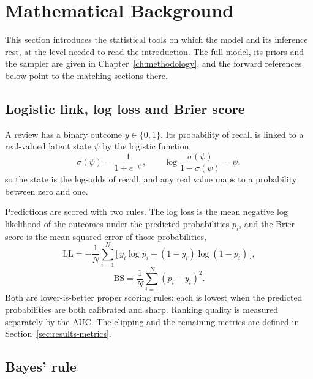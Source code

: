 \section{Mathematical Background}
\label{sec:intro-math}

This section introduces the statistical tools on which the model and its inference rest, at the level needed to read the introduction. The full model, its priors and the sampler are given in Chapter~\ref{ch:methodology}, and the forward references below point to the matching sections there.

\subsection{Logistic link, log loss and Brier score}
\label{sec:intro-math-logit}

A review has a binary outcome $y \in \{0,1\}$. Its probability of recall is linked to a real-valued latent state $\psi$ by the logistic function
\begin{equation}
  \sigma(\psi) = \frac{1}{1+e^{-\psi}}, \qquad \log\frac{\sigma(\psi)}{1-\sigma(\psi)} = \psi,
  \label{eq:intro-logit}
\end{equation}
so the state is the log-odds of recall, and any real value maps to a probability between zero and one.

Predictions are scored with two rules. The log loss is the mean negative log likelihood of the outcomes under the predicted probabilities $p_i$, and the Brier score is the mean squared error of those probabilities,
\begin{equation}
  \mathrm{LL} = -\frac{1}{N}\sum_{i=1}^{N}\bigl[\,y_i\log p_i + (1-y_i)\log(1-p_i)\,\bigr],
  \label{eq:intro-logloss}
\end{equation}
\begin{equation}
  \mathrm{BS} = \frac{1}{N}\sum_{i=1}^{N}(p_i - y_i)^2.
  \label{eq:intro-brier}
\end{equation}
Both are lower-is-better proper scoring rules: each is lowest when the predicted probabilities are both calibrated and sharp. Ranking quality is measured separately by the AUC. The clipping and the remaining metrics are defined in Section~\ref{sec:results-metrics}.

\subsection{Bayes' rule}
\label{sec:intro-math-bayes}

